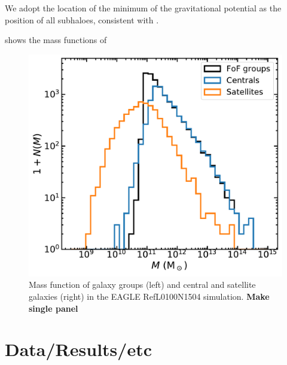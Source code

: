 \documentclass[usenatbib,fleqn]{mnras}
\begin{document}
We adopt the location of the minimum of the gravitational potential as the position of all subhaloes, consistent with \cite{velliscig17}.

 shows the mass functions of 

\begin{figure}
  \centerline{\includegraphics[width=\linewidth]{massfunction.pdf}}
\caption{Mass function of galaxy groups (left) and central and satellite galaxies (right) in the EAGLE RefL0100N1504 simulation. \textbf{Make single panel}}
\label{f:massfunction}
\end{figure}


\section{Data/Results/etc}
\end{document}
